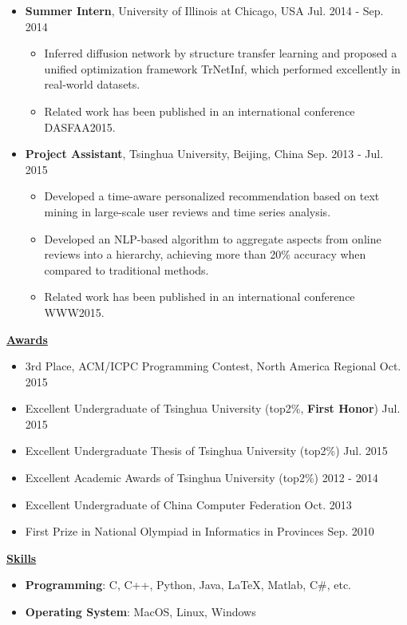 \documentclass[11pt]{article}
\begin{document}
\begin{CJK}{GBK}{kai}
\begin{itemize}
   \item \textbf{Summer Intern}, University of Illinois at Chicago, USA \hfill Jul. 2014 - Sep. 2014\\
     \begin{itemize}
     \item Inferred diffusion network  by structure transfer learning and proposed a unified optimization framework TrNetInf, which performed excellently in real-world datasets.
     \item Related work has been published in an international conference DASFAA2015. \\\medskip
     \end{itemize}
  
   \item \textbf{Project Assistant}, Tsinghua University, Beijing, China \hfill Sep. 2013 - Jul. 2015\\
     \begin{itemize}
     \item Developed a time-aware personalized recommendation based on text mining in large-scale user reviews and time series analysis. 
     \item Developed an NLP-based algorithm to aggregate aspects from online reviews into a hierarchy, achieving more than 20\% accuracy when compared to traditional methods.
     \item Related work has been published in an international conference WWW2015.
     \end{itemize}
\end{itemize}


\bigskip

{ \textbf{\underline{Awards}}}\\
\begin{itemize}
\item 3rd Place, ACM/ICPC Programming Contest, North America Regional \hfill Oct. 2015
\item Excellent Undergraduate of Tsinghua University (top2\%, \textbf{First Honor}) \hfill Jul. 2015
\item Excellent Undergraduate Thesis of Tsinghua University (top2\%) \hfill Jul. 2015
\item Excellent Academic Awards of Tsinghua University (top2\%) \hfill 2012 - 2014
\item Excellent Undergraduate of China Computer Federation \hfill Oct. 2013
\item First Prize in National Olympiad in Informatics in Provinces \hfill Sep. 2010
\end{itemize}

\bigskip

{ \textbf{\underline{Skills}}}
\begin{itemize}
    \item \textbf{Programming}: C, C++, Python, Java, {\LaTeX},  Matlab, C\#, etc.\\\smallskip
    \item \textbf{Operating System}: MacOS, Linux, Windows
\end{itemize}

\end{CJK}
\end{document}
